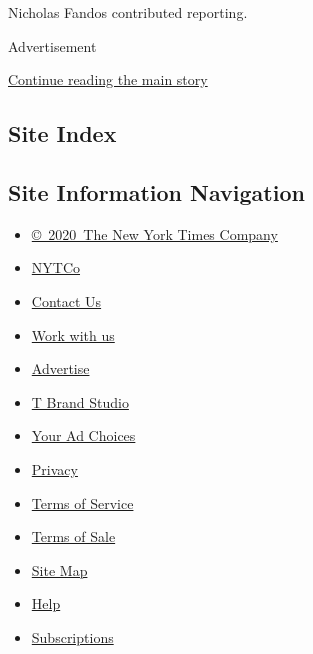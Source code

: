 Nicholas Fandos contributed reporting.

Advertisement

\protect\hyperlink{after-bottom}{Continue reading the main story}

\hypertarget{site-index}{%
\subsection{Site Index}\label{site-index}}

\hypertarget{site-information-navigation}{%
\subsection{Site Information
Navigation}\label{site-information-navigation}}

\begin{itemize}
\tightlist
\item
  \href{https://help.nytimes3xbfgragh.onion/hc/en-us/articles/115014792127-Copyright-notice}{©~2020~The
  New York Times Company}
\end{itemize}

\begin{itemize}
\tightlist
\item
  \href{https://www.nytco.com/}{NYTCo}
\item
  \href{https://help.nytimes3xbfgragh.onion/hc/en-us/articles/115015385887-Contact-Us}{Contact
  Us}
\item
  \href{https://www.nytco.com/careers/}{Work with us}
\item
  \href{https://nytmediakit.com/}{Advertise}
\item
  \href{http://www.tbrandstudio.com/}{T Brand Studio}
\item
  \href{https://www.nytimes3xbfgragh.onion/privacy/cookie-policy\#how-do-i-manage-trackers}{Your
  Ad Choices}
\item
  \href{https://www.nytimes3xbfgragh.onion/privacy}{Privacy}
\item
  \href{https://help.nytimes3xbfgragh.onion/hc/en-us/articles/115014893428-Terms-of-service}{Terms
  of Service}
\item
  \href{https://help.nytimes3xbfgragh.onion/hc/en-us/articles/115014893968-Terms-of-sale}{Terms
  of Sale}
\item
  \href{https://spiderbites.nytimes3xbfgragh.onion}{Site Map}
\item
  \href{https://help.nytimes3xbfgragh.onion/hc/en-us}{Help}
\item
  \href{https://www.nytimes3xbfgragh.onion/subscription?campaignId=37WXW}{Subscriptions}
\end{itemize}

